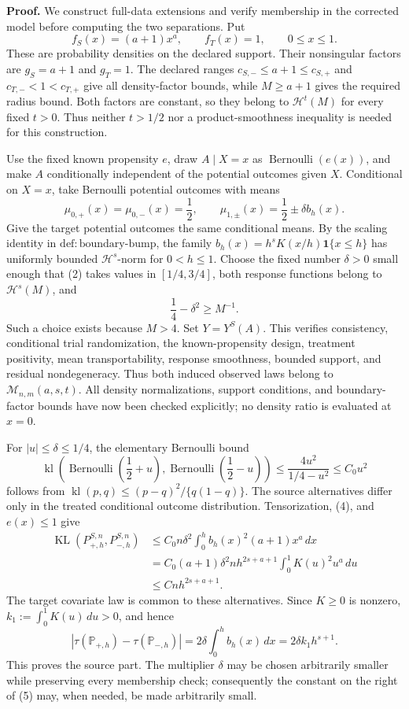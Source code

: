 \textbf{Proof.}
We construct full-data extensions and verify membership in the corrected model before computing the two separations. Put
\[
f_S(x)=(a+1)x^a,
\qquad
f_T(x)=1,
\qquad 0\le x\le1.
\tag{1}
\]
These are probability densities on the declared support. Their nonsingular factors are \(g_S=a+1\) and \(g_T=1\). The declared ranges \(c_{S,-}\le a+1\le c_{S,+}\) and \(c_{T,-}<1<c_{T,+}\) give all density-factor bounds, while \(M\ge a+1\) gives the required radius bound. Both factors are constant, so they belong to \(\mathcal H^t(M)\) for every fixed \(t>0\). Thus neither \(t>1/2\) nor a product-smoothness inequality is needed for this construction.

Use the fixed known propensity \(e\), draw \(A\mid X=x\) as \(\operatorname{Bernoulli}(e(x))\), and make \(A\) conditionally independent of the potential outcomes given \(X\). Conditional on \(X=x\), take Bernoulli potential outcomes with means
\[
\mu_{0,+}(x)=\mu_{0,-}(x)=\frac12,
\qquad
\mu_{1,\pm}(x)=\frac12\pm\delta b_h(x).
\tag{2}
\]
Give the target potential outcomes the same conditional means. By the scaling identity in \(\mathrm{def:boundary\text{-}bump}\), the family \(b_h(x)=h^sK(x/h)\mathbf 1\{x\le h\}\) has uniformly bounded \(\mathcal H^s\)-norm for \(0<h\le1\). Choose the fixed number \(\delta>0\) small enough that (2) takes values in \([1/4,3/4]\), both response functions belong to \(\mathcal H^s(M)\), and
\[
\frac14-\delta^2\ge M^{-1}.
\tag{3}
\]
Such a choice exists because \(M>4\). Set \(Y=Y^S(A)\). This verifies consistency, conditional trial randomization, the known-propensity design, treatment positivity, mean transportability, response smoothness, bounded support, and residual nondegeneracy. Thus both induced observed laws belong to \(\mathcal M_{n,m}(a,s,t)\). All density normalizations, support conditions, and boundary-factor bounds have now been checked explicitly; no density ratio is evaluated at \(x=0\).

For \(|u|\le\delta\le1/4\), the elementary Bernoulli bound
\[
\operatorname{kl}\!\left(\operatorname{Bernoulli}\!\left(\frac12+u\right),
\operatorname{Bernoulli}\!\left(\frac12-u\right)\right)
\le \frac{4u^2}{1/4-u^2}
\le C_0u^2
\tag{4}
\]
follows from \(\operatorname{kl}(p,q)\le(p-q)^2/\{q(1-q)\}\). The source alternatives differ only in the treated conditional outcome distribution. Tensorization, (4), and \(e(x)\le1\) give
\[
\begin{aligned}
\operatorname{KL}(P_{+,h}^{S,n},P_{-,h}^{S,n})
&\le C_0n\delta^2\int_0^h b_h(x)^2(a+1)x^a\,dx\\
&=C_0(a+1)\delta^2nh^{2s+a+1}
  \int_0^1K(u)^2u^a\,du\\
&\le Cnh^{2s+a+1}.
\end{aligned}
\tag{5}
\]
The target covariate law is common to these alternatives. Since \(K\ge0\) is nonzero, \(k_1:=\int_0^1K(u)\,du>0\), and hence
\[
\left|\tau(\mathbb P_{+,h})-\tau(\mathbb P_{-,h})\right|
=2\delta\int_0^hb_h(x)\,dx
=2\delta k_1h^{s+1}.
\tag{6}
\]
This proves the source part. The multiplier \(\delta\) may be chosen arbitrarily smaller while preserving every membership check; consequently the constant on the right of (5) may, when needed, be made arbitrarily small.

